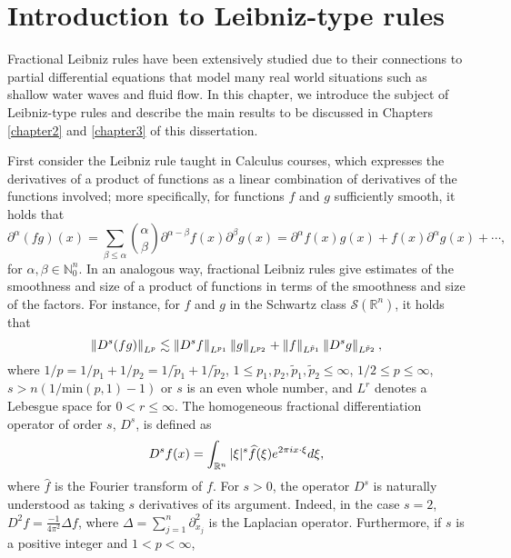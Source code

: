
\cleardoublepage


\chapter{Introduction to Leibniz-type rules}\label{chapter1}
\label{makereference1}

Fractional Leibniz rules have been extensively studied due to their connections to partial differential equations that model many real world situations such as shallow water waves and fluid flow. In this chapter, we introduce the subject of Leibniz-type rules and describe the main results to be discussed in Chapters \ref{chapter2} and \ref{chapter3} of this dissertation.


First consider the Leibniz rule taught in Calculus courses, which expresses the derivatives of a product of functions as a linear combination of derivatives of the functions involved; more specifically, for functions $f$ and $g$ sufficiently smooth, it holds that
\[\partial^\alpha (fg)(x) = \sum_{\beta \leq \alpha} \binom{\alpha}{\beta} \partial^{\alpha - \beta} f(x) \partial^{\beta} g(x) = \partial^\alpha f(x) g(x) + f(x) \partial^\alpha g(x) + \cdots ,\]
for $\alpha,\beta \in \mathbb{N}^n_0$.
In an analogous way, fractional Leibniz rules give estimates of the smoothness and size of a product of functions in terms of the smoothness and size of the factors. For instance, for $f$ and $g$ in the Schwartz class $\mathcal{S}(\mathbb{R}^n)$, it holds that
\begin{equation}\label{def:leibniz}
\left\|D^s (fg)\right\|_{L^p} \lesssim \left\|D^s f\right\|_{L^{p_1}}\left\|g\right\|_{L^{p_2}} + \left\|f\right\|_{L^{\tilde{p}_1}}\left\|D^s g\right\|_{L^{\tilde{p}_2}},
\end{equation}
where $1/p = 1/p_1 + 1/p_2 =  1/\tilde{p}_1 + 1/\tilde{p}_2$, $1\leq p_1,p_2,\tilde{p}_1,\tilde{p}_2\leq \infty$, $1/2 \leq p\leq \infty$, $s>n(1/\text{min}(p,1) - 1)$ or $s$ is an even whole number, and $L^r$ denotes a Lebesgue space for $0<r\leq \infty$. The homogeneous fractional differentiation operator of order $s$, $D^s$, is defined as \[D^s f(x) = \int_{{\mathbb R}^n} |\xi|^s \widehat{f}(\xi) e^{2\pi i x\cdot \xi} d\xi,\]
where $\widehat{f}$ is the Fourier transform of $f$.
For $s>0$, the operator $D^s$ is naturally understood as taking $s$ derivatives of its argument. Indeed, in the case $s=2$, $D^2f = \frac{-1}{4\pi^2}\Delta f$, where $\Delta = \sum_{j=1}^n \partial^2_{x_j}$ is the Laplacian operator. Furthermore, if $s$ is a positive integer and $1<p<\infty$,

